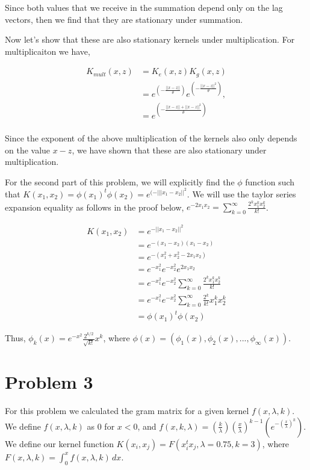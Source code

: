 \documentclass[paper=a4, fontsize=11pt]{scrartcl} %
\begin{document}
Since both values that we receive in the summation depend only on the lag vectors, then we find that they are stationary under summation.

Now let's show that these are also stationary kernels under multiplication.  For multiplicaiton we have,

\begin{align}
K_{mult}(x,z) &= K_e(x,z)K_g(x,z) \\
&= e^{(-\frac{||x-z||}{\theta})}e^{(-\frac{||x-z||^2}{\theta})}, \\
&=  e^{(-\frac{||x-z||+||x-z||^2}{\theta})}\\
\end{align}

Since the exponent of the above multiplication of the kernels also only depends on the value $x-z$, we have shown that these are also stationary under multiplication.

For the second part of this problem, we will explicitly find the $\phi$ function such that $K(x_1,x_2) = \phi(x_1)^t\phi(x_2) =  e^{(-|||x_1-x_2||^2}$.  We will use the taylor series expansion equality as follows in the proof below, $e^{-2x_1x_2} = \sum \limits_{k=0}^\infty \frac{2^kx_1^kx_2^k}{k!}$. 

\begin{align}
K(x_1,x_2) &= e^{-||x_1-x_2||^2} \\
&= e^{-(x_1-x_2)(x_1-x_2)}\\
&= e^{-(x_1^{2} + x_2^{2} - 2x_1x_2)} \\
&= e^{-x_1^{2}}e^{-x_2^{2}}e^{2x_1x_2} \\
&= e^{-x_1^{2}}e^{-x_2^{2}} \sum \limits_{k=0}^\infty \frac{2^kx_1^kx_2^k}{k!} \\
&= e^{-x_1^{2}}e^{-x_2^{2}}\sum \limits_{k=0}^\infty \frac{2^{k}}{k!}x_1^kx_2^k \\
&= \phi(x_1)^t\phi(x_2)
\end{align}

Thus, $\phi_k(x) = e^{-x^2}\frac{2^{k/2}}{\sqrt{k!}}x^k$, where $\phi(x) = (\phi_1(x),\phi_2(x),...,\phi_\infty(x))$.

\section{Problem 3}

For this problem we calculated the gram matrix for a given kernel $f(x,\lambda,k)$.
We define $f(x,\lambda,k)$ as $0$ for $x < 0$, and $f(x,k,\lambda)=(\frac{k}{\lambda})(\frac{x}{\lambda})^{k-1}(e^{-(\frac{x}{\lambda})^k})$.
We define our kernel function $K(x_i,x_j) = F(x_i^tx_j,\lambda=0.75,k=3)$, where $F(x,\lambda,k) =\int^x_0 f(x,\lambda,k)\,dx$. 
\end{document}

